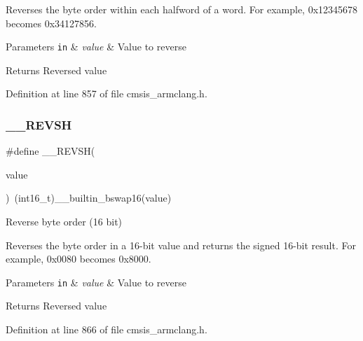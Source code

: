 Reverses the byte order within each halfword of a word. For example, 0x12345678 becomes 0x34127856. 
\begin{DoxyParams}[1]{Parameters}
\mbox{\tt in}  & {\em value} & Value to reverse \\
\hline
\end{DoxyParams}
\begin{DoxyReturn}{Returns}
Reversed value 
\end{DoxyReturn}


Definition at line 857 of file cmsis\+\_\+armclang.\+h.

\mbox{\label{group___c_m_s_i_s___core___instruction_interface_gae580812686119c9c5cf3c11a7519a404}} 
\subsubsection{\texorpdfstring{\+\_\+\+\_\+\+R\+E\+V\+SH}{\_\_REVSH}}
{\footnotesize\ttfamily \#define \+\_\+\+\_\+\+R\+E\+V\+SH(\begin{DoxyParamCaption}\item[{}]{value }\end{DoxyParamCaption})~(int16\+\_\+t)\+\_\+\+\_\+builtin\+\_\+bswap16(value)}



Reverse byte order (16 bit) 

Reverses the byte order in a 16-\/bit value and returns the signed 16-\/bit result. For example, 0x0080 becomes 0x8000. 
\begin{DoxyParams}[1]{Parameters}
\mbox{\tt in}  & {\em value} & Value to reverse \\
\hline
\end{DoxyParams}
\begin{DoxyReturn}{Returns}
Reversed value 
\end{DoxyReturn}


Definition at line 866 of file cmsis\+\_\+armclang.\+h.

\mbox{\label{group___c_m_s_i_s___core___instruction_interface_ga95b9bd281ddeda378b85afdb8f2ced86}} 
